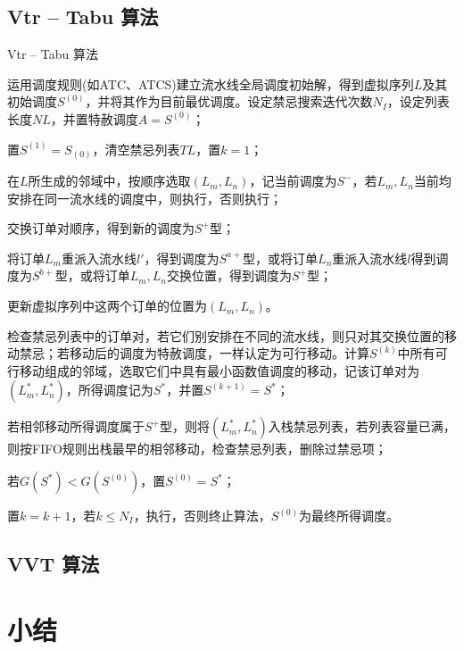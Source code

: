 \subsection{Vtr -- Tabu 算法}
\begin{algori}
Vtr -- Tabu 算法
\begin{asparaenum}
\renewcommand{\labelenumi}{\bf Step\theenumi~}
\item 运用调度规则(如ATC、ATCS)建立流水线全局调度初始解，得到虚拟序列$L$及其初始调度$S^{(0)}$，并将其作为目前最优调度。设定禁忌搜索迭代次数$N_I$，设定列表长度$NL$，并置特赦调度$A = S^{(0)}$；
\item 置$S^{(1)} = S_{(0)}$，清空禁忌列表$TL$，置$k = 1$；
\item 在$L$所生成的邻域中，按顺序选取$(L_m, L_n)$，记当前调度为$S^-$，若$L_m, L_n$当前均安排在同一流水线的调度中，则执行，否则执行；
\item 交换订单对顺序，得到新的调度为$S^+$型；
\item 将订单$L_m$重派入流水线$l'$，得到调度为$S^{a+}$型，或将订单$L_n$重派入流水线$l$得到调度为$S^{b+}$型，或将订单$L_m, L_n$交换位置，得到调度为$S^+$型；
\item 更新虚拟序列中这两个订单的位置为$(L_m, L_n)$。
\item 检查禁忌列表中的订单对，若它们别安排在不同的流水线，则只对其交换位置的移动禁忌；若移动后的调度为特赦调度，一样认定为可行移动。计算$S^{(k)}$中所有可行移动组成的邻域，选取它们中具有最小函数值调度的移动，记该订单对为$(L_m^*, L_n^*)$，所得调度记为$S^*$，并置$S^{(k+1)} = S^*$；
\item 若相邻移动所得调度属于$S^+$型，则将$(L_m^*, L_n^*)$入栈禁忌列表，若列表容量已满，则按FIFO规则出栈最早的相邻移动，检查禁忌列表，删除过禁忌项；
\item 若$G(S^*) < G(S^{(0)})$，置$S^{(0)} = S^*$；
\item 置$k = k + 1$，若$k\le N_I$，执行，否则终止算法，$S^{(0)}$为最终所得调度。
\end{asparaenum}
\end{algori}
\subsection{VVT 算法}

\section{小结}

